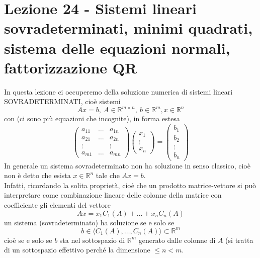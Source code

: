 \section[Lezione 24 - Sistemi lineari sovradeterminati, fattorizzazione QR]{Lezione 24 - Sistemi lineari sovradeterminati, minimi quadrati, sistema delle equazioni normali, fattorizzazione QR}

In questa lezione ci occuperemo della soluzione numerica di sistemi lineari SOVRADETERMINATI, cioè sistemi
\begin{equation*}
    Ax=b, \ A\in \mathbb{R}^{m\times n}, \ b\in \mathbb{R}^m, x\in \mathbb{R}^n
\end{equation*}
con  (ci sono più equazioni che incognite), in forma estesa
\begin{equation*}
    \begin{pmatrix}
        a_{11} & \dots & a_{1n} \\
        a_{21} & \dots & a_{2n} \\
        \vdots &  & \vdots \\
        a_{m1} & \dots & a_{mn} 
    \end{pmatrix}
    \begin{pmatrix}
        x_1 \\
        \vdots \\
        x_n
    \end{pmatrix}=
    \begin{pmatrix}
        b_1 \\
        b_2 \\
        \vdots \\
        b_n
    \end{pmatrix}
\end{equation*}
In generale un sistema sovradeterminato non ha soluzione in senso classico, cioè non è detto che esista $x \in \mathbb{R}^n$ tale che $Ax=b$. \\
Infatti, ricordando la solita proprietà, cioè che un prodotto matrice-vettore si può interpretare come combinazione lineare delle colonne della matrice con coefficiente gli elementi del vettore
\begin{equation*}
    Ax=x_1 C_1(A) + \dots + x_n C_n(A)
\end{equation*}
un sistema (sovradeterminato) ha soluzione se e solo se
\begin{equation*}
    b \in \langle C_1(A), \dots, C_n(A) \rangle \subset \mathbb{R}^m
\end{equation*}
cioè se e solo se $b$ sta nel sottospazio di $\mathbb{R}^m$ generato dalle colonne di $A$ (si tratta di un sottospazio effettivo perché la dimensione $\leq n < m$. \\
